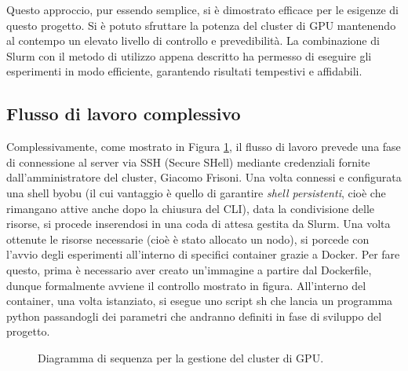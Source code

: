 \documentclass[12pt,a4paper,twoside,openright]{book}
\begin{document}
Questo approccio, pur essendo semplice, si è dimostrato efficace per le esigenze di questo progetto. Si è potuto sfruttare la potenza del cluster di GPU mantenendo al contempo un elevato livello di controllo e prevedibilità. La combinazione di Slurm con il metodo di utilizzo appena descritto ha permesso di eseguire gli esperimenti in modo efficiente, garantendo risultati tempestivi e affidabili.

\subsection{Flusso di lavoro complessivo}
Complessivamente, come mostrato in Figura \ref{fig:seq-cluster}, il flusso di lavoro prevede una fase di connessione al server via SSH (Secure SHell) mediante credenziali fornite dall'amministratore del cluster, Giacomo Frisoni. Una volta connessi e configurata una shell byobu (il cui vantaggio è quello di garantire \emph{shell persistenti}, cioè che rimangano attive anche dopo la chiusura del CLI), data la condivisione delle risorse, si procede inserendosi in una coda di attesa gestita da Slurm. Una volta ottenute le risorse necessarie (cioè è stato allocato un nodo), si porcede con l'avvio degli esperimenti all'interno di specifici container grazie a Docker. Per fare questo, prima è necessario aver creato un'immagine a partire dal Dockerfile,  dunque formalmente avviene il controllo mostrato in figura.
All'interno del container, una volta istanziato, si esegue uno script sh che lancia un programma python passandogli dei parametri che andranno definiti in fase di sviluppo del progetto.

\begin{figure}
\centering
{}
\caption{Diagramma di sequenza per la gestione del cluster di GPU.}
\label{fig:seq-cluster}
\end{figure}
\end{document}
